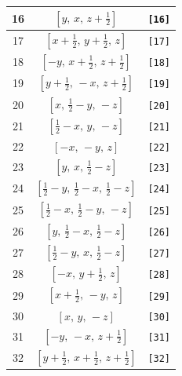 \documentclass[fleqn,8pt]{jsarticle}
\begin{document}
\begin{longtable}{ccc}
16 & $\left[ y,\, x,\, z + \frac{1}{2} \right]$ & {\tt [16]} \\ \hline
17 & $\left[ x + \frac{1}{2},\, y + \frac{1}{2},\, z \right]$ & {\tt [17]} \\ \hline
18 & $\left[ - y,\, x + \frac{1}{2},\, z + \frac{1}{2} \right]$ & {\tt [18]} \\ \hline
19 & $\left[ y + \frac{1}{2},\, - x,\, z + \frac{1}{2} \right]$ & {\tt [19]} \\ \hline
20 & $\left[ x,\, \frac{1}{2} - y,\, - z \right]$ & {\tt [20]} \\ \hline
21 & $\left[ \frac{1}{2} - x,\, y,\, - z \right]$ & {\tt [21]} \\ \hline
22 & $\left[ - x,\, - y,\, z \right]$ & {\tt [22]} \\ \hline
23 & $\left[ y,\, x,\, \frac{1}{2} - z \right]$ & {\tt [23]} \\ \hline
24 & $\left[ \frac{1}{2} - y,\, \frac{1}{2} - x,\, \frac{1}{2} - z \right]$ & {\tt [24]} \\ \hline
25 & $\left[ \frac{1}{2} - x,\, \frac{1}{2} - y,\, - z \right]$ & {\tt [25]} \\ \hline
26 & $\left[ y,\, \frac{1}{2} - x,\, \frac{1}{2} - z \right]$ & {\tt [26]} \\ \hline
27 & $\left[ \frac{1}{2} - y,\, x,\, \frac{1}{2} - z \right]$ & {\tt [27]} \\ \hline
28 & $\left[ - x,\, y + \frac{1}{2},\, z \right]$ & {\tt [28]} \\ \hline
29 & $\left[ x + \frac{1}{2},\, - y,\, z \right]$ & {\tt [29]} \\ \hline
30 & $\left[ x,\, y,\, - z \right]$ & {\tt [30]} \\ \hline
31 & $\left[ - y,\, - x,\, z + \frac{1}{2} \right]$ & {\tt [31]} \\ \hline
32 & $\left[ y + \frac{1}{2},\, x + \frac{1}{2},\, z + \frac{1}{2} \right]$ & {\tt [32]} \\
\end{longtable}
\end{document}
